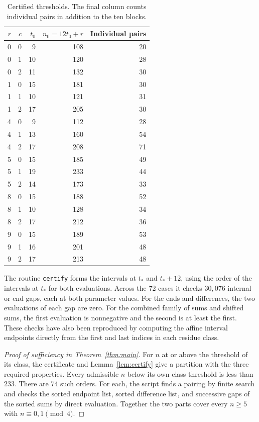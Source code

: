 \documentclass[11pt]{amsart}
\begin{document}
\begin{table}[htbp]
\centering
\caption{Certified thresholds. The final column counts individual
pairs in addition to the ten blocks.}
\label{tab:thresholds}
\begin{tabular}{@{}rrrrr@{}}
\toprule
\(r\) & \(c\) & \(t_0\) & \(n_0=12t_0+r\) & Individual pairs\\
\midrule
0 & 0 & 9 & 108 & 20\\
0 & 1 & 10 & 120 & 28\\
0 & 2 & 11 & 132 & 30\\
1 & 0 & 15 & 181 & 30\\
1 & 1 & 10 & 121 & 31\\
1 & 2 & 17 & 205 & 30\\
4 & 0 & 9 & 112 & 28\\
4 & 1 & 13 & 160 & 54\\
4 & 2 & 17 & 208 & 71\\
5 & 0 & 15 & 185 & 49\\
5 & 1 & 19 & 233 & 44\\
5 & 2 & 14 & 173 & 33\\
8 & 0 & 15 & 188 & 52\\
8 & 1 & 10 & 128 & 34\\
8 & 2 & 17 & 212 & 36\\
9 & 0 & 15 & 189 & 53\\
9 & 1 & 16 & 201 & 48\\
9 & 2 & 17 & 213 & 48\\
\bottomrule
\end{tabular}
\end{table}

The routine \texttt{certify} forms the intervals at \(t_*\)
and \(t_*+12\), using the order of the intervals at \(t_*\)
for both evaluations. Across the 72 cases it checks
\(30{,}076\) internal or end gaps, each at both parameter
values. For the ends and differences, the two evaluations of
each gap are zero. For the combined family of sums and shifted
sums, the first evaluation is nonnegative and the second is at
least the first. These checks have also been reproduced by
computing the affine interval endpoints directly from the first
and last indices in each residue class.

\begin{proof}[Proof of sufficiency in Theorem~\ref{thm:main}]
For \(n\) at or above the threshold of its class, the
certificate and Lemma~\ref{lem:certify} give a partition with
the three required properties. Every admissible \(n\) below its
own class threshold is less than \(233\). There are 74 such
orders. For each, the script finds a pairing by finite search
and checks the sorted endpoint list, sorted difference list,
and successive gaps of the sorted sums by direct evaluation.
Together the two parts cover every \(n\ge5\) with
\(n\equiv0,1\pmod4\).
\end{proof}
\end{document}
